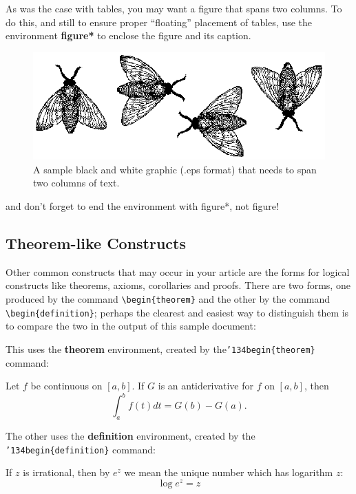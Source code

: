 \documentclass[acmtog, authorversion]{acmart}
\begin{document}
As was the case with tables, you may want a figure that spans two
columns.  To do this, and still to ensure proper ``floating''
placement of tables, use the environment \textbf{figure*} to
enclose the figure and its caption.
\begin{figure}
    \centering 
    \includegraphics{flies.eps} 
    \caption{A sample black and white graphic (.eps format) that needs to span two columns of text.}
\end{figure}
and don't forget to end the environment with {figure*}, not
{figure}!


\subsection{Theorem-like Constructs}
Other common constructs that may occur in your article are the
forms for logical constructs like theorems, axioms, corollaries
and proofs.  There are two forms, one produced by the command
\texttt{\textbackslash begin\{theorem\}} and the other by the command
\texttt{\textbackslash begin\{definition\}}; perhaps the clearest and easiest way
to distinguish them is to compare the two in the output of this
sample document:

This uses the \textbf{theorem} environment, created by
the\linebreak\texttt{{\char'134}begin\{theorem\}} command:

\begin{theorem}
Let $f$ be continuous on $[a,b]$.  If $G$ is an antiderivative for
$f$ on $[a,b]$, then
\begin{displaymath}\int^b_af(t)dt = G(b) - G(a).\end{displaymath}
\end{theorem}

The other uses the \textbf{definition} environment, created by the
\texttt{{\char'134}begin\{definition\}} command:
\begin{definition}
If $z$ is irrational, then by $e^z$ we mean the unique number
which has logarithm $z$: \begin{displaymath}{\log e^z =
z}\end{displaymath}
\end{definition}
\end{document}
